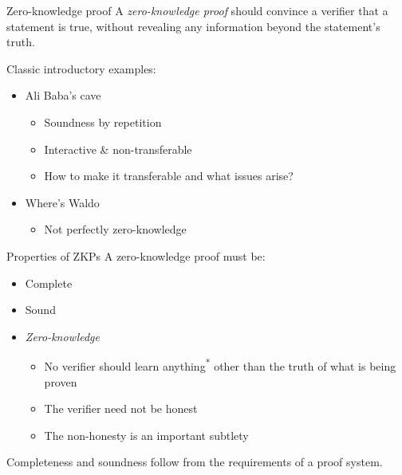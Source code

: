 \begin{frame}{Zero-knowledge proof}
  A \emph{zero-knowledge proof} should convince a verifier that a statement is true, without revealing any information beyond the statement's truth.

  \vspace*{1em}

  \pause
  Classic introductory examples:
  \begin{itemize}[<+(1)->]
    \item Ali Baba's cave
    \begin{itemize}
      \item Soundness by repetition
      \item Interactive \& non-transferable
      \item How to make it transferable and what issues arise?
    \end{itemize}
    \item Where's Waldo
    \begin{itemize}
      \item Not perfectly zero-knowledge
    \end{itemize}
  \end{itemize}
\end{frame}

\begin{frame}{Properties of ZKPs}
  A zero-knowledge proof must be:
  \begin{itemize}[<+(1)->]
    \item Complete
    \item Sound
    \item \emph{Zero-knowledge}
    \begin{itemize}
      \item No verifier should learn anything\textsuperscript{*} other than the truth of what is being proven
      \item The verifier need not be honest
      \item The non-honesty is an important subtlety
    \end{itemize}
  \end{itemize}

  \pause
  Completeness and soundness follow from the requirements of a proof system.
\end{frame}

